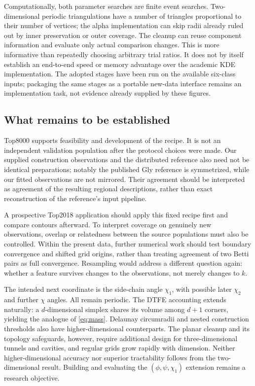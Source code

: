 \documentclass[11pt]{article}
\begin{document}
Computationally, both parameter searches are finite event searches.
Two-dimensional periodic triangulations have a number of triangles
proportional to their number of vertices; the alpha implementation can
skip radii already ruled out by inner preservation or outer coverage.
The cleanup can reuse component information and evaluate only actual
comparison changes. This is more informative than repeatedly choosing
arbitrary trial ratios. It does not by itself establish an end-to-end
speed or memory advantage over the academic KDE implementation. The
adopted stages have been run on the available six-class inputs; packaging
the same stages as a portable new-data interface remains an implementation
task, not evidence already supplied by these figures.

\subsection{What remains to be established}

Top8000 supports feasibility and development of the recipe. It is not an
independent validation population after the protocol choices were made.
Our supplied construction observations and the distributed reference also
need not be identical preparations; notably the published Gly reference
is symmetrized, while our fitted observations are not mirrored. Their
agreement should be interpreted as agreement of the resulting regional
descriptions, rather than exact reconstruction of the reference's input
pipeline.

A prospective Top2018 application should apply this fixed recipe first
and compare contours afterward. To interpret coverage on genuinely new
observations, overlap or relatedness between the source populations must
also be controlled. Within the present data, further numerical work should
test boundary convergence and shifted grid origins, rather than treating
agreement of two Betti pairs as full convergence. Resampling would address
a different question again: whether a feature survives changes to the
observations, not merely changes to $k$.

The intended next coordinate is the side-chain angle $\chi_1$, with
possible later $\chi_2$ and further $\chi$ angles. All remain periodic.
The DTFE accounting extends naturally: a $d$-dimensional simplex shares
its volume among $d+1$ corners, yielding the analogue of
\eqref{eq:mass}. Delaunay circumradii and nested construction thresholds
also have higher-dimensional counterparts. The planar cleanup and its
topology safeguards, however, require additional design for three-dimensional
tunnels and cavities, and regular grids grow rapidly with dimension.
Neither higher-dimensional accuracy nor superior tractability follows
from the two-dimensional result. Building and evaluating the
$(\phi,\psi,\chi_1)$ extension remains a research objective.
\end{document}
